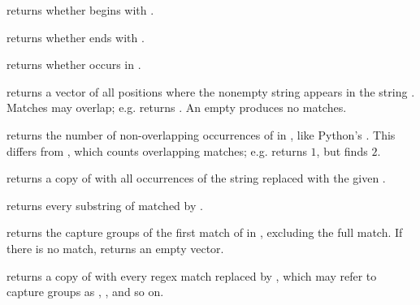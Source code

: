 \begin{compactitem}
  \item {} returns whether  begins with .
  \item {} returns whether  ends with .
  \item {} returns whether  occurs in .
  \item {} returns a vector of all positions where the nonempty string  appears in the string . Matches may overlap; e.g.  returns . An empty  produces no matches.
  \item {} returns the number of non-overlapping occurrences of  in , like Python's . This differs from , which counts overlapping matches; e.g.  returns $1$, but  finds $2$.
  \item {} returns a copy of  with all occurrences of the string  replaced with the given .
  \item {} returns every substring of  matched by .
  \item {} returns the capture groups of the first match of  in , excluding the full match. If there is no match, returns an empty vector.
  \item {} returns a copy of  with every regex match replaced by , which may refer to capture groups as , , and so on.
\end{compactitem}

